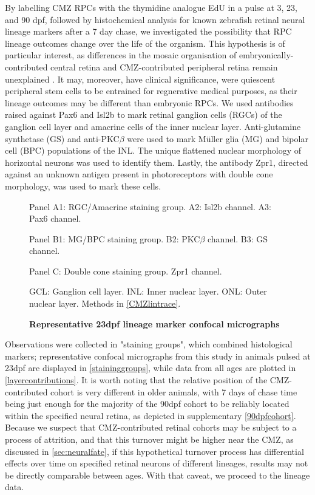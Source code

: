 By labelling CMZ RPCs with the thymidine analogue EdU in a pulse at 3, 23, and 90 dpf, followed by histochemical analysis for known zebrafish retinal neural lineage markers after a 7 day chase, we investigated the possibility that RPC lineage outcomes change over the life of the organism. This hypothesis is of particular interest, as differences in the mosaic organisation of embryonically-contributed central retina and CMZ-contributed peripheral retina remain unexplained \cite{Allison2010}. It may, moreover, have clinical significance, were quiescent peripheral stem cells to be entrained for regnerative medical purposes, as their lineage outcomes may be different than embryonic RPCs.  We used antibodies raised against Pax6 and Isl2b to mark retinal ganglion cells (RGCs) of the ganglion cell layer and amacrine cells of the inner nuclear layer. Anti-glutamine synthetase (GS) and anti-PKC$\beta$ were used to mark M\"{u}ller glia (MG) and bipolar cell (BPC) populations of the INL. The unique flattened nuclear morphology of horizontal neurons was used to identify them. Lastly, the antibody Zpr1, directed against an unknown antigen present in photoreceptors with double cone morphology, was used to mark these cells.

\begin{figure}[!h]
    \caption{{\bf Representative 23dpf lineage marker confocal micrographs}}
    Panel A1: RGC/Amacrine staining group. A2: Isl2b channel. A3: Pax6 channel.

    Panel B1: MG/BPC staining group. B2: PKC$\beta$ channel. B3: GS channel.

    Panel C: Double cone staining group. Zpr1 channel.

    GCL: Ganglion cell layer. INL: Inner nuclear layer. ONL: Outer nuclear layer.
    Methods in \autoref{CMZlintrace}.
    \label{staininggroups}
\end{figure}

Observations were collected in "staining groups", which combined histological markers; representative confocal micrographs from this study in animals pulsed at 23dpf are displayed in \autoref{staininggroups}, while data from all ages are plotted in \autoref{layercontributions}. It is worth noting that the relative position of the CMZ-contributed cohort is very different in older animals, with 7 days of chase time being just enough for the majority of the 90dpf cohort to be reliably located within the specified neural retina, as depicted in supplementary \autoref{90dpfcohort}. Because we suspect that CMZ-contributed retinal cohorts may be subject to a process of attrition, and that this turnover might be higher near the CMZ, as discussed in \autoref{sec:neuralfate}, if this hypothetical turnover process has differential effects over time on specified retinal neurons of different lineages, results may not be directly comparable between ages. With that caveat, we proceed to the lineage data.


